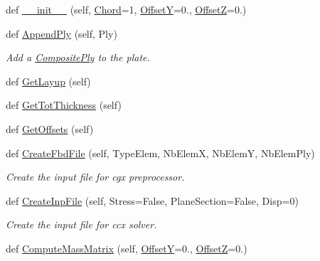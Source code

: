 \begin{DoxyCompactItemize}
\item 
def \hyperlink{classgebtaero_1_1_composite_plate_1_1_composite_plate_a067ac11419d1959770398cce5de0a561}{\+\_\+\+\_\+init\+\_\+\+\_\+} (self, \hyperlink{classgebtaero_1_1_composite_plate_1_1_composite_plate_a60ae01b006e99e542c3759058e82e4cb}{Chord}=1, \hyperlink{classgebtaero_1_1_composite_plate_1_1_composite_plate_a33de8af0e1aaff88563310459b3b6f6b}{OffsetY}=0., \hyperlink{classgebtaero_1_1_composite_plate_1_1_composite_plate_aaf910e794c2f390a539b41a90dd30c83}{OffsetZ}=0.)
\item 
def \hyperlink{classgebtaero_1_1_composite_plate_1_1_composite_plate_ab41dbc2cc5c5a502f3b1d4b9bc51fbf5}{Append\+Ply} (self, Ply)
\begin{DoxyCompactList}\small\item\em Add a \hyperlink{namespacegebtaero_1_1_composite_ply}{Composite\+Ply} to the plate. \end{DoxyCompactList}\item 
def \hyperlink{classgebtaero_1_1_composite_plate_1_1_composite_plate_a37b3c4c3dc5cd919ccfc06828448911b}{Get\+Layup} (self)
\item 
def \hyperlink{classgebtaero_1_1_composite_plate_1_1_composite_plate_a093864b1001bc131f474adbd543390c6}{Get\+Tot\+Thickness} (self)
\item 
def \hyperlink{classgebtaero_1_1_composite_plate_1_1_composite_plate_a179bd2f7f860afe99ab99e928fa12d11}{Get\+Offsets} (self)
\item 
def \hyperlink{classgebtaero_1_1_composite_plate_1_1_composite_plate_a4225c3b5b70c5e76260434da2403e77d}{Create\+Fbd\+File} (self, Type\+Elem, Nb\+ElemX, Nb\+ElemY, Nb\+Elem\+Ply)
\begin{DoxyCompactList}\small\item\em Create the input file for cgx preprocessor. \end{DoxyCompactList}\item 
def \hyperlink{classgebtaero_1_1_composite_plate_1_1_composite_plate_ab2aef5a02f71d8f508d4a8f1684295fd}{Create\+Inp\+File} (self, Stress=False, Plane\+Section=False, Disp=0)
\begin{DoxyCompactList}\small\item\em Create the input file for ccx solver. \end{DoxyCompactList}\item 
def \hyperlink{classgebtaero_1_1_composite_plate_1_1_composite_plate_a13b1222bb715056417c9db9903d264a2}{Compute\+Mass\+Matrix} (self, \hyperlink{classgebtaero_1_1_composite_plate_1_1_composite_plate_a33de8af0e1aaff88563310459b3b6f6b}{OffsetY}=0., \hyperlink{classgebtaero_1_1_composite_plate_1_1_composite_plate_aaf910e794c2f390a539b41a90dd30c83}{OffsetZ}=0.)

\end{DoxyCompactItemize}
